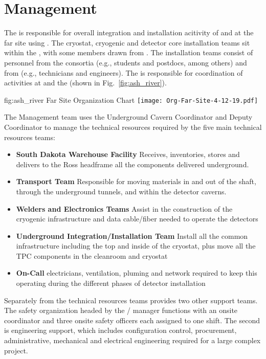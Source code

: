 \section{ Management}
\label{vl:tc-facility_mgmt}

The  is responsible for overall integration and
installation acitivity of  and  at the far
site using . The cryostat, cryogenic and detector core
installation teams sit within the , with some members drawn
from . The installation teams consist of personnel from the
consortia (e.g., students and postdocs, among others) and from
 (e.g., technicians and engineers). The  is responsible
for coordination of activities at \surf and the  
(shown in Fig.~\ref{fig:ash_river}).
\begin{dunefigure}{fig:ash_river}
  {Far Site Organization Chart}
  \texttt{[image: Org-Far-Site-4-12-19.pdf]}
\end{dunefigure}


The  Management team uses the Underground Cavern Coordinator and
Deputy Coordinator to manage the technical resources required by the
five main technical resources teams:
\begin{itemize}
\item {\bf South Dakota Warehouse Facility} Receives, inventories,
  stores and delivers to the Ross headframe all the components
  delivered underground.
 \item {\bf Transport Team} Responsible for moving materials in and out
   of the shaft, through the underground tunnels, and within the
   detector caverns.
 \item {\bf Welders and Electronics Teams} Assist in the construction of
   the cryogenic infrastructure and data cable/fiber needed to operate
   the detectors
 \item {\bf Underground Integration/Installation Team} Install all the
   common infrastructure including the top and inside of the cryostat,
   plus move all the TPC components in the cleanroom and cryostat
 \item {\bf On-Call} electricians, ventilation, pluming and network
   required to keep this operating during the different phases of
   detector installation
\end{itemize}

Separately from the technical resources teams  provides two
other support teams.  The safety organization headed by the
/  manager functions with an
onsite  coordinator and three onsite safety officers each
assigned to one shift.  The second is engineering support, which
includes configuration control, procurement, administrative,
mechanical and electrical engineering required for a large complex
project.


